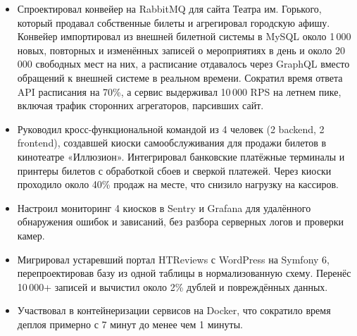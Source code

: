 \documentclass[10pt,a4paper]{article}
\begin{document}
\newpage
{}
\begin{itemize}
  \item Спроектировал конвейер на RabbitMQ для сайта Театра им. Горького, который продавал собственные билеты и агрегировал городскую афишу. Конвейер импортировал из внешней билетной системы в MySQL около 1\,000 новых, повторных и изменённых записей о мероприятиях в день и около 20\,000 свободных мест на них, а расписание отдавалось через GraphQL вместо обращений к внешней системе в реальном времени. Сократил время ответа API расписания на 70\%, а сервис выдерживал 10\,000 RPS на летнем пике, включая трафик сторонних агрегаторов, парсивших сайт.
  \item Руководил кросс-функциональной командой из 4 человек (2 backend, 2 frontend), создавшей киоски самообслуживания для продажи билетов в кинотеатре «Иллюзион». Интегрировал банковские платёжные терминалы и принтеры билетов с обработкой сбоев и сверкой платежей. Через киоски проходило около 40\% продаж на месте, что снизило нагрузку на кассиров.
  \item Настроил мониторинг 4 киосков в Sentry и Grafana для удалённого обнаружения ошибок и зависаний, без разбора серверных логов и проверки камер.
  \item Мигрировал устаревший портал HTReviews с WordPress на Symfony 6, перепроектировав базу из одной таблицы в нормализованную схему. Перенёс 10\,000+ записей и вычистил около 2\% дублей и повреждённых данных.
  \item Участвовал в контейнеризации сервисов на Docker, что сократило время деплоя примерно с 7 минут до менее чем 1 минуты.
\end{itemize}


\end{document}
